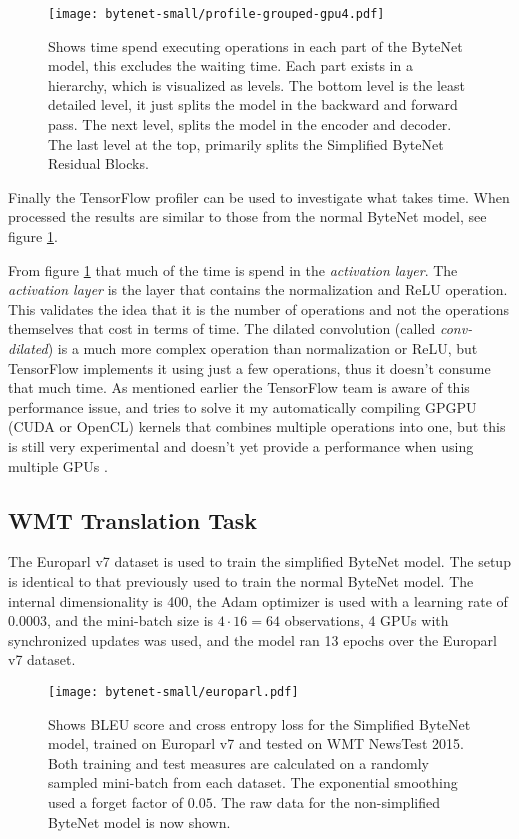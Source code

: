 \begin{figure}[h]
    \centering
    \texttt{[image: bytenet-small/profile-grouped-gpu4.pdf]}
    \caption{Shows time spend executing operations in each part of the ByteNet model, this excludes the waiting time. Each part exists in a hierarchy, which is visualized as levels. The bottom level is the least detailed level, it just splits the model in the backward and forward pass. The next level, splits the model in the encoder and decoder. The last level at the top, primarily splits the Simplified ByteNet Residual Blocks.}
    \label{fig:result:simple-bytenet:profile-grouped}
\end{figure}

Finally the TensorFlow profiler can be used to investigate what takes time. When processed the results are similar to those from the normal ByteNet model, see figure \ref{fig:result:simple-bytenet:profile-grouped}.

From figure \ref{fig:result:simple-bytenet:profile-grouped} that much of the time is spend in the \textit{activation layer}. The \textit{activation layer} is the layer that contains the normalization and ReLU operation. This validates the idea that it is the number of operations and not the operations themselves that cost in terms of time. The dilated convolution (called \textit{conv-dilated}) is a much more complex operation than normalization or ReLU, but TensorFlow implements it using just a few operations, thus it doesn't consume that much time. As mentioned earlier the TensorFlow team is aware of this performance issue, and tries to solve it my automatically compiling GPGPU (CUDA or OpenCL) kernels that combines multiple operations into one, but this is still very experimental and doesn't yet provide a performance when using multiple GPUs \cite{citation-needed}.

\clearpage
\subsection{WMT Translation Task}

The Europarl v7 dataset is used to train the simplified ByteNet model. The setup is identical to that previously used to train the normal ByteNet model. The internal dimensionality is 400, the Adam optimizer is used with a learning rate of 0.0003, and the mini-batch size is $4 \cdot 16 = 64$ observations, 4 GPUs with synchronized updates was used, and the model ran 13 epochs over the Europarl v7 dataset.

\begin{figure}[h]
    \centering
    \texttt{[image: bytenet-small/europarl.pdf]}
    \caption{Shows BLEU score and cross entropy loss for the Simplified ByteNet model, trained on Europarl v7 and tested on WMT NewsTest 2015. Both training and test measures are calculated on a randomly sampled mini-batch from each dataset. The exponential smoothing used a forget factor of $0.05$. The raw data for the non-simplified ByteNet model is now shown.}
    \label{fig:result:bytenet-small:europarl}
\end{figure}

